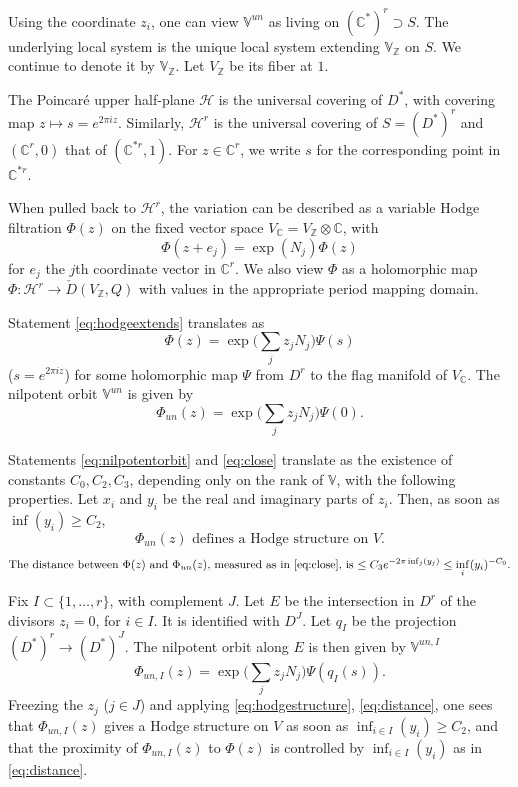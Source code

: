 \documentclass[11pt,a4paper]{article}
\theoremstyle{plain}
\theoremstyle{definition}
\begin{document}
Using the coordinate $z_i$, one can view $\mathbb{V}^{un}$ as living on $(\mathbb{C}^*)^r\supset S$. The underlying local system is the unique local system extending $\mathbb{V}_{\mathbb{Z}}$ on $S$. We continue to denote it by $\mathbb{V}_{\mathbb{Z}}$. Let $V_{\mathbb{Z}}$ be its fiber at $1$.

The Poincar\'e upper half-plane $\mathcal{H}$ is the universal covering of $D^*$, with covering map $z\mapsto s=e^{2\pi iz}$. Similarly, $\mathcal{H}^r$ is the universal covering of $S=(D^*)^r$ and $(\mathbb{C}^r,0)$ that of $(\mathbb{C}^{*r},1)$. For $z\in\mathbb{C}^r$, we write $s$ for the corresponding point in $\mathbb{C}^{*r}$.

When pulled back to $\mathcal{H}^r$, the variation can be described as a variable Hodge filtration $\Phi(z)$ on the fixed vector space $V_{\mathbb{C}}=V_{\mathbb{Z}}\otimes\mathbb{C}$, with
\[
\Phi(z+e_j)=\exp(N_j)\Phi(z)
\]
for $e_j$ the $j$th coordinate vector in $\mathbb{C}^r$. We also view $\Phi$ as a holomorphic map $\Phi:\mathcal{H}^r\to\check{D}(V_{\mathbb{Z}},Q)$ with values in the appropriate period mapping domain.

Statement \eqref{eq:hodgeextends} translates as
\begin{equation}\label{eq:nilpotentform}
\Phi(z)=\exp\bigl(\sum_j z_j N_j\bigr)\Psi(s)
\end{equation}
($s=e^{2\pi iz}$) for some holomorphic map $\Psi$ from $D^r$ to the flag manifold of $V_{\mathbb{C}}$. The nilpotent orbit $\mathbb{V}^{un}$ is given by
\[
\Phi_{un}(z)=\exp\bigl(\sum_j z_j N_j\bigr)\Psi(0).
\]

Statements \eqref{eq:nilpotentorbit} and \eqref{eq:close} translate as the existence of constants $C_0,C_2,C_3$, depending only on the rank of $\mathbb{V}$, with the following properties. Let $x_i$ and $y_i$ be the real and imaginary parts of $z_i$. Then, as soon as $\inf(y_i)\geq C_2$,
\begin{equation}\label{eq:hodgestructure}
\Phi_{un}(z)\text{ defines a Hodge structure on }V.
\end{equation}
\begin{equation}\label{eq:distance}
\text{The distance between $\Phi(z)$ and $\Phi_{un}(z)$, measured as in \eqref{eq:close}, is $\leq C_3 e^{-2\pi\inf_j(y_j)}\leq\inf_i(y_i)^{-C_0}$.}
\end{equation}

Fix $I\subset\{1,\dots,r\}$, with complement $J$. Let $E$ be the intersection in $D^r$ of the divisors $z_i=0$, for $i\in I$. It is identified with $D^J$. Let $q_I$ be the projection $(D^*)^r\to(D^*)^J$. The nilpotent orbit along $E$ is then given by $\mathbb{V}^{un,I}$
\[
\Phi_{un,I}(z)=\exp\bigl(\sum_j z_j N_j\bigr)\Psi(q_I(s)).
\]
Freezing the $z_j$ ($j\in J$) and applying \eqref{eq:hodgestructure}, \eqref{eq:distance}, one sees that $\Phi_{un,I}(z)$ gives a Hodge structure on $V$ as soon as $\inf_{i\in I}(y_i)\geq C_2$, and that the proximity of $\Phi_{un,I}(z)$ to $\Phi(z)$ is controlled by $\inf_{i\in I}(y_i)$ as in \eqref{eq:distance}.
\end{document}
